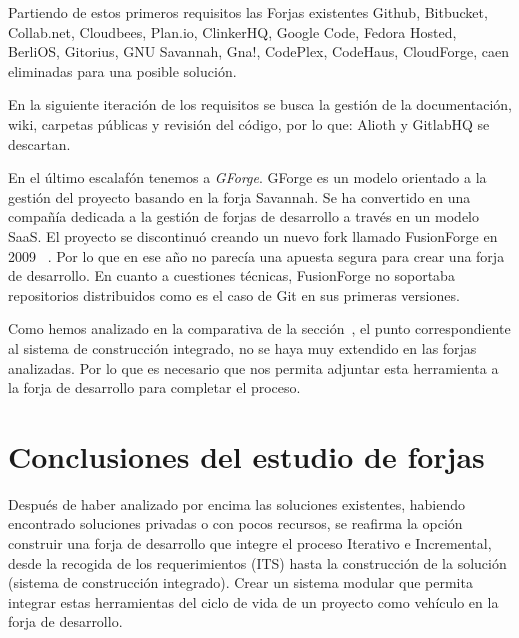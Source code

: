 \par Partiendo de estos primeros requisitos las Forjas existentes Github, Bitbucket, Collab.net, Cloudbees, Plan.io, ClinkerHQ, Google Code, Fedora Hosted, BerliOS, Gitorius, GNU Savannah, Gna!, CodePlex, CodeHaus, CloudForge, caen eliminadas para una posible solución.

\par En la siguiente iteración de los requisitos se busca la gestión de la documentación, wiki, carpetas públicas y revisión del código, por lo que: Alioth y GitlabHQ se descartan.

\par En el último escalafón tenemos a \emph{GForge}. GForge es un modelo orientado a la gestión del proyecto basando en la forja Savannah. Se ha convertido en una compañía dedicada a la gestión de forjas de desarrollo a través en un modelo SaaS. El proyecto se discontinuó creando un nuevo fork llamado FusionForge en 2009~\cite{bitergia-fusionforge-analysis} . Por lo que en ese año no parecía una apuesta segura para crear una forja de desarrollo. En cuanto a cuestiones técnicas, FusionForge no soportaba repositorios distribuidos como es el caso de Git en sus primeras versiones.

\par Como hemos analizado en la comparativa de la sección~, el punto correspondiente al sistema de construcción integrado, no se haya muy extendido en las forjas analizadas. Por lo que es necesario que nos permita adjuntar esta herramienta a la forja de desarrollo para completar el proceso.


\section{Conclusiones del estudio de forjas}
\label{sec:conclusiones}

\par Después de haber analizado por encima las soluciones existentes, habiendo encontrado soluciones privadas o con pocos recursos, se reafirma la opción construir una forja de desarrollo que integre el proceso Iterativo e Incremental, desde la recogida de los requerimientos (ITS) hasta la construcción de la solución (sistema de construcción integrado). Crear un sistema modular que permita integrar estas herramientas del ciclo de vida de un proyecto como vehículo en la forja de desarrollo.

